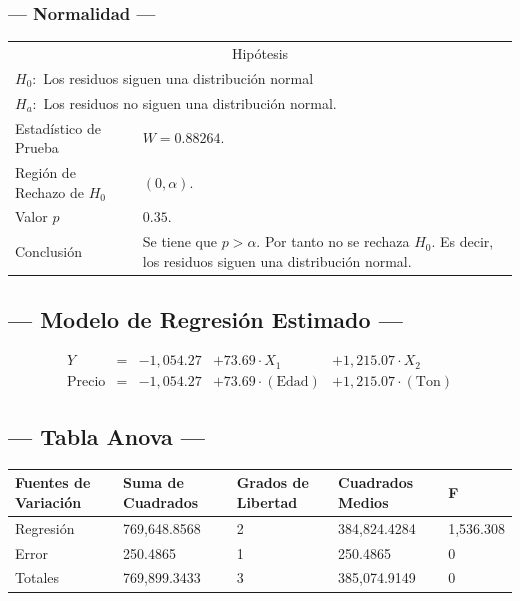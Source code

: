 \subsubsection{--- Normalidad ---} %
\begin{center}
  \begin{tabular}{|l|p{8cm}|}
    \cline{1-2}
    \multicolumn{2}{|c|}{Hipótesis}\\ \cline{1-2}
    \multicolumn{2}{|l|}{\(H_0:\) Los residuos siguen una distribución normal} \\ 
    \multicolumn{2}{|l|}{\(H_a:\) Los residuos no siguen una distribución normal.} \\ \cline{1-2}
    Estadístico de Prueba & \(W = 0.88264\).\\ \cline{1-2} 
		Región de Rechazo de \(H_0\) & \((0, \alpha )\).\\ \cline{1-2} 
    Valor \(p\) & \(0.35\).\\ \cline{1-2} 
    Conclusión & Se tiene que \(p> \alpha\). \newline 
		Por tanto no se rechaza \(H_0\). \newline 
		Es decir, los residuos siguen una distribución normal.\\ \cline{1-2} 
  \end{tabular}
\end{center}


\subsection{\centering --- Modelo de Regresión Estimado ---} %
\begin{align}
	Y & = &              -1,054.27 & + 73.69 \cdot X_1           & + 1,215.07   \cdot X_2   \\[2mm]
	\mbox{Precio} & = &  -1,054.27 & + 73.69 \cdot (\mbox{Edad}) & + 1,215.07   \cdot (\mbox{Ton})
	\label{eq:2}
\end{align}

\subsection{\centering --- Tabla Anova ---} %
\begin{center}
  \begin{tabular}{|l|l|l|l|l|}
    \hline 
    Fuentes de Variación  & Suma de Cuadrados & Grados de Libertad & Cuadrados Medios & F\\ \hline 
		Regresión & 769,648.8568  & 2 & 384,824.4284 & 1,536.308 \\ \hline
		Error     &     250.4865  & 1 &     250.4865 &    0 \\ \hline
		Totales   & 769,899.3433  & 3 & 385,074.9149 &    0 \\ \hline
  \end{tabular}
\end{center} 

